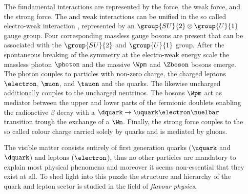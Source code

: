 The fundamental interactions are represented by the \EM force, the weak force,
and the strong force. The \EM and weak interactions can be unified in the so
called electro-weak interaction \cite{set:gws}, represented by an
$\group{SU}{2}\otimes\group{U}{1}$ gauge group. Four corresponding massless
gauge bosons are present that can be associated with the $\group{SU}{2}$ and
$\group{U}{1}$ group. After the spontaneous breaking of the symmetry at the
electro-weak energy scale the massless photon $\photon$ and the massive $\Wpm$
and $\Zboson$ bosons emerge. The photon couples to particles with non-zero \EM
charge, \ie the charged leptons $\electron$, $\muon$, and $\tauon$ and the
quarks. The likewise uncharged \Zboson additionally couples to the uncharged
neutrinos. The bosons $\Wpm$ act as mediator between the upper and lower parts
of the fermionic doublets enabling \eg the radioactive $\beta$ decay with a
$\dquark\to\uquark\electron\nuelbar$ transition trough the exchange of a $\Wm$.
Finally, the strong force couples to the so called colour charge carried solely
by quarks and is mediated by gluons.


The visible matter consists entirely of first generation quarks ($\uquark$ and
$\dquark$) and leptons ($\electron$), thus no other particles are mandatory to
explain most physical phenomena and moreover it seems non-essential that they
exist at all. To shed light into this puzzle the structure and hierarchy of the
quark and lepton sector is studied in the field of \emph{flavour physics}.
